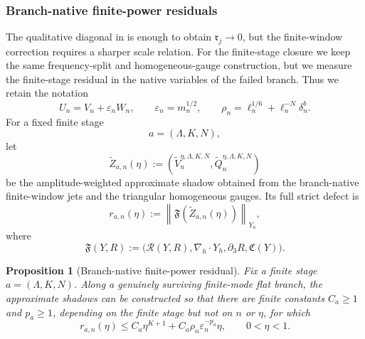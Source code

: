 \documentclass[11pt]{article}
\numberwithin{equation}{section}
\theoremstyle{plain}
\newtheorem{proposition}{Proposition}[section]
\theoremstyle{definition}
\theoremstyle{remark}
\newcommand{\divh}{\nabla_h\!\cdot}
\newcommand{\norm}[2]{\left\|#1\right\|_{#2}}
\newcommand{\calC}{\mathfrak C}
\newcommand{\calR}{\mathcal R}
\begin{document}
\subsubsection{Branch-native finite-power residuals}

The qualitative diagonal in  is enough to obtain
\(\mathfrak r_j\to0\), but the finite-window correction requires a sharper scale relation.
For the finite-stage closure we keep the same frequency-split and homogeneous-gauge
construction, but we measure the finite-stage residual in the native variables of the
failed branch. Thus we retain the notation
\[
        U_n=V_n+\varepsilon_nW_n,
        \qquad
        \varepsilon_n=m_n^{1/2},
        \qquad
        \rho_n=\ell_n^{1/6}+\ell_n^{-N}\delta_n^b .
\]
For a fixed finite stage
\[
        a=(\Lambda,K,N),
\]
let
\[
        \widetilde Z_{a,n}(\eta)
        :=
        \left(\widetilde V^{\eta,\Lambda,K,N}_n,
        \widetilde Q^{\eta,\Lambda,K,N}_n\right)
\]
be the amplitude-weighted approximate shadow obtained from the branch-native
finite-window jets and the triangular homogeneous gauges. Its full strict defect is
\[
        r_{a,n}(\eta):=
        \norm{\mathfrak F(\widetilde Z_{a,n}(\eta))}{Y_a},
\]
where
\begin{equation}\label{pIV:eq:defect-map-finite-stage}
        \mathfrak F(Y,R)
        :=
        \bigl(\calR(Y,R),\divh Y_h,\partial_3R,\calC(Y)\bigr).
\end{equation}

\begin{proposition}[Branch-native finite-power residual]
\label{pIV:prop:branch-native-residual}
Fix a finite stage \(a=(\Lambda,K,N)\). Along a genuinely surviving finite-mode
flat branch, the approximate shadows can be constructed so that there are finite
constants \(C_a\ge1\) and \(p_a\ge1\), depending on the finite stage but not on
\(n\) or \(\eta\), for which
\begin{equation}\label{pIV:eq:finite-stage-residual}
        r_{a,n}(\eta)
        \le
        C_a\eta^{K+1}
        +C_a\rho_n\varepsilon_n^{-p_a}\eta,
        \qquad 0<\eta<1.
\end{equation}
\end{proposition}
\end{document}
